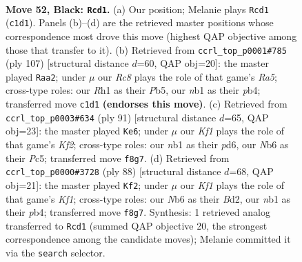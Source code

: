 \documentclass[11pt]{article}
\begin{document}
\clearpage

\begin{figure}[p]\centering
\begin{subfigure}{0.46\textwidth}\centering
\resizebox{\linewidth}{!}{%
\newchessgame
\chessboard[
  setfen={5k2/5p1p/1n4p1/p3p1P1/P3P3/1P4RP/5KP1/RNr4r b - - 19 52},
  showmover=false,
  pgfstyle=straightmove, color=movearrow, markmove={c1-d1}
]}
\caption{}
\end{subfigure}\hfill
\begin{subfigure}{0.46\textwidth}\centering
\resizebox{\linewidth}{!}{%
\newchessgame
\chessboard[
  setfen={8/2p1k1p1/4p2p/1p5P/rP1RRPP1/3P2K1/1r6/8 b - - 0 54},
  showmover=false,
  pgfstyle=straightmove, color=movearrow, markmove={a4-a2}
]}
\caption{}
\end{subfigure}
\\[4pt]
\begin{subfigure}{0.46\textwidth}\centering
\resizebox{\linewidth}{!}{%
\newchessgame
\chessboard[
  setfen={3r4/3r1k2/1p1P2p1/p1pR1p1p/P1P4P/3R2P1/5PK1/8 b - - 9 46},
  showmover=false,
  pgfstyle=straightmove, color=movearrow, markmove={f7-e6}
]}
\caption{}
\end{subfigure}\hfill
\begin{subfigure}{0.46\textwidth}\centering
\resizebox{\linewidth}{!}{%
\newchessgame
\chessboard[
  setfen={5b2/1r3k2/5pp1/1r5p/1p2P2P/1R3P2/R2B2P1/5K2 w - - 26 45},
  showmover=false,
  pgfstyle=straightmove, color=movearrow, markmove={f1-f2}
]}
\caption{}
\end{subfigure}
\caption{\textbf{Move 52, Black: \texttt{Rcd1}.} (a) Our position; Melanie plays \texttt{Rcd1} (\texttt{c1d1}). Panels (b)--(d) are the retrieved master positions whose correspondence most drove this move (highest QAP objective among those that transfer to it). (b) Retrieved from \texttt{ccrl\_top\_p0001\#785} (ply 107) [structural distance $d$=60, QAP obj=20]: the master played \texttt{Raa2}; under $\mu$ our \emph{Rc8} plays the role of that game's \emph{Ra5}; cross-type roles: our \emph{R}h1 as their \emph{P}b5, our \emph{n}b1 as their \emph{p}b4; transferred move \texttt{c1d1} \textbf{(endorses this move)}. (c) Retrieved from \texttt{ccrl\_top\_p0003\#634} (ply 91) [structural distance $d$=65, QAP obj=23]: the master played \texttt{Ke6}; under $\mu$ our \emph{Kf1} plays the role of that game's \emph{Kf2}; cross-type roles: our \emph{n}b1 as their \emph{p}d6, our \emph{N}b6 as their \emph{P}c5; transferred move \texttt{f8g7}. (d) Retrieved from \texttt{ccrl\_top\_p0000\#3728} (ply 88) [structural distance $d$=68, QAP obj=21]: the master played \texttt{Kf2}; under $\mu$ our \emph{Kf1} plays the role of that game's \emph{Kf1}; cross-type roles: our \emph{N}b6 as their \emph{B}d2, our \emph{n}b1 as their \emph{p}b4; transferred move \texttt{f8g7}. Synthesis: 1 retrieved analog transferred to \texttt{Rcd1} (summed QAP objective 20, the strongest correspondence among the candidate moves); Melanie committed it via the \texttt{search} selector.}
\label{fig:thought-m103}
\end{figure}
\end{document}
